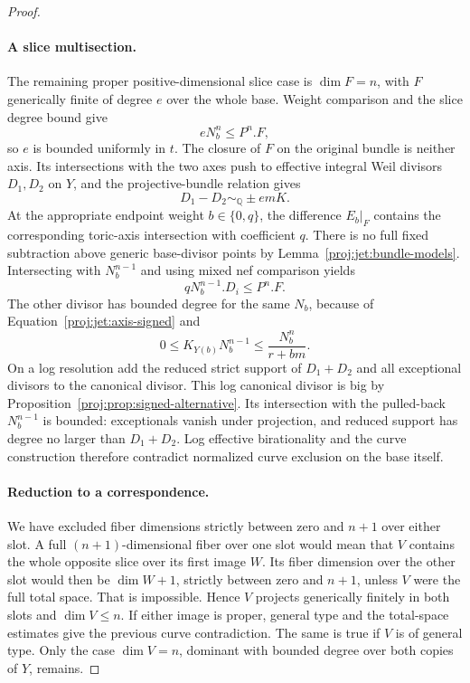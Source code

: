 \documentclass[11pt,letterpaper]{article}
\theoremstyle{definition}
\theoremstyle{remark}
\begin{document}
\begin{proof}
\paragraph{A slice multisection.}
The remaining proper positive-dimensional slice case is
\(\dim F=n\), with \(F\) generically finite of degree \(e\) over
the whole base.  Weight comparison and the slice degree bound give
\[
 eN_b^n\le P^n.F,
\]
so \(e\) is bounded uniformly in \(t\).
The closure of \(F\) on the original bundle is neither axis.
Its intersections with the two axes push to effective integral
Weil divisors \(D_1,D_2\) on \(Y\), and the projective-bundle
relation gives
\begin{equation}\label{proj:jet:axis-signed}
 D_1-D_2\sim_{\mathbb{Q}} \pm emK.
\end{equation}
At the appropriate endpoint weight \(b\in\{0,q\}\), the difference
\(E_b|_F\) contains the corresponding toric-axis intersection with
coefficient \(q\).  There is no full fixed subtraction above
generic base-divisor points by Lemma~\ref{proj:jet:bundle-models}.
Intersecting with \(N_b^{n-1}\) and using mixed nef comparison yields
\[
 qN_b^{n-1}.D_i\le P^n.F.
\]
The other divisor has bounded degree for the same \(N_b\), because
of Equation~\eqref{proj:jet:axis-signed} and
\[
 0\le K_{Y(b)}N_b^{n-1}\le\frac{N_b^n}{r+bm}.
\]
On a log resolution add the reduced strict support of
\(D_1+D_2\) and all exceptional divisors to the canonical divisor.
This log canonical divisor is big by
Proposition~\ref{proj:prop:signed-alternative}.
Its intersection with the pulled-back \(N_b^{n-1}\) is bounded:
exceptionals vanish under projection, and reduced support has
degree no larger than \(D_1+D_2\).
Log effective birationality and the curve construction therefore
contradict normalized curve exclusion on the base itself.

\paragraph{Reduction to a correspondence.}
We have excluded fiber dimensions strictly between zero and
\(n+1\) over either slot.  A full \((n+1)\)-dimensional fiber over
one slot would mean that \(V\) contains the whole opposite slice
over its first image \(W\).  Its fiber dimension over the other
slot would then be \(\dim W+1\), strictly between zero and \(n+1\),
unless \(V\) were the full total space.  That is impossible.
Hence \(V\) projects generically finitely in both slots and
\(\dim V\le n\).  If either image is proper, general type and the
total-space estimates give the previous curve contradiction.
The same is true if \(V\) is of general type.
Only the case \(\dim V=n\), dominant with bounded degree over both
copies of \(Y\), remains.


\end{proof}
\end{document}

